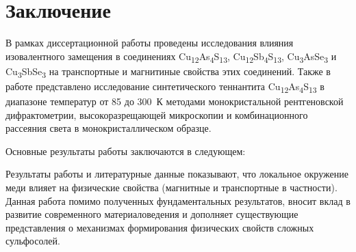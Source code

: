 \chapter*{Заключение}						%



В рамках диссертационной работы проведены исследования влияния изовалентного замещения в соединениях Cu\textsubscript{12}As\textsubscript{4}S\textsubscript{13}, Cu\textsubscript{12}Sb\textsubscript{4}S\textsubscript{13}, Cu\textsubscript{3}AsSe\textsubscript{3} и Cu\textsubscript{3}SbSe\textsubscript{3} на транспортные и магнитиные свойства этих соединений. 
Также в работе представлено исследование  синтетического теннантита Cu\textsubscript{12}As\textsubscript{4}S\textsubscript{13} в диапазоне температур от 85 до 300~К методами монокристальной рентгеновской дифрактометрии, высокоразрещающей микроскопии и комбинационного рассеяния света в монокристаллическом образце.

Основные результаты работы заключаются в следующем:


Результаты работы и литературные данные показывают, что локальное окружение меди влияет на физические свойства (магнитные и транспортные в частности). Данная работа помимо полученных фундаментальных результатов, вносит вклад в развитие современного материаловедения и дополняет существующие представления о механизмах формирования физических свойств сложных сульфосолей.



